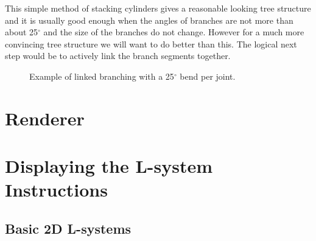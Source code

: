 \begin{flushleft}
\FloatBarrier

\vspace{5mm}


\vspace{5mm}

This simple method of stacking cylinders gives a reasonable looking tree structure and it is usually good enough when the angles of branches are not more than about 25$^{\circ}$ and the size of the branches do not change. However for a much more convincing tree structure we will want to do better than this. The logical next step would be to actively link the branch segments together.

\FloatBarrier

\begin{figure}[htbp]
	{\centering
		\vspace{7px}
		\setlength{\fboxrule}{1pt}
		\caption{Example of linked branching with a 25$^{\circ}$ bend per joint.}
	}
\end{figure}

\FloatBarrier

\end{flushleft}

\section{Renderer}

\begin{flushleft}


\end{flushleft}

\section{Displaying the L-system Instructions} \label{Display L-system Instructions}

\subsection{Basic 2D L-systems} 


